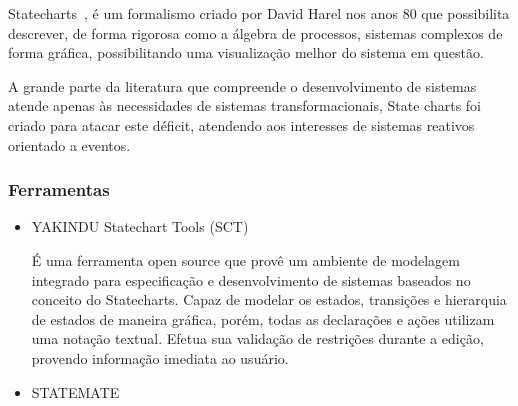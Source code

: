 Statecharts~\cite{Harel:1987:SVF:34884.34886}, é um formalismo criado por
David Harel nos anos 80 que possibilita descrever, de forma rigorosa como a
álgebra de processos, sistemas complexos de forma gráfica, possibilitando uma
visualização melhor do sistema em questão.

A grande parte da literatura que compreende o desenvolvimento de sistemas atende
apenas às necessidades de sistemas transformacionais, State charts foi criado para
atacar este déficit, atendendo aos interesses de sistemas reativos orientado a eventos.

\subsubsection{Ferramentas}
\begin{itemize}

\item{YAKINDU Statechart Tools (SCT)}

É uma ferramenta open source que provê um ambiente de modelagem integrado para especificação e
desenvolvimento de sistemas baseados no conceito do Statecharts. Capaz de modelar os estados, transições
e hierarquia de estados de maneira gráfica, porém, todas as declarações e ações utilizam uma notação
textual. Efetua sua validação de restrições durante a edição, provendo informação imediata ao usuário.


\item{STATEMATE}

\end{itemize}
